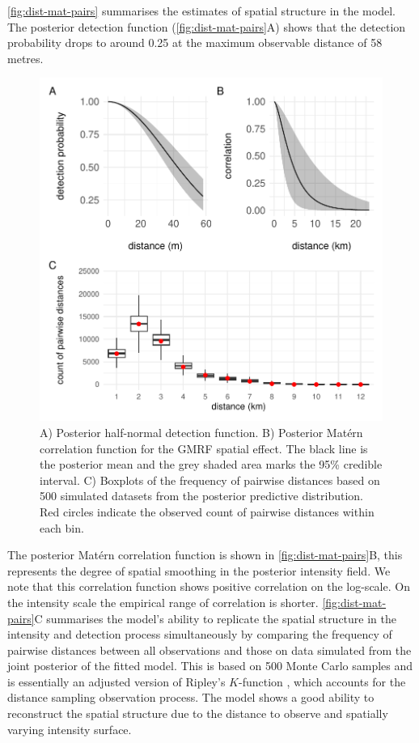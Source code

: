 \documentclass{statsoc}
\begin{document}
\autoref{fig:dist-mat-pairs} summarises the estimates of spatial structure in the model.  The posterior detection function (\autoref{fig:dist-mat-pairs}A) shows that the detection probability drops to around 0.25 at the maximum observable distance of 58 metres.
\begin{figure}[!htb]
	\begin{center}
		\includegraphics[width=\textwidth]{figures/dist_mat_pairs.pdf}
		\caption{A) Posterior half-normal detection function. B) Posterior Mat\'ern correlation function for the GMRF spatial effect.  The black line is the posterior mean and the grey shaded area marks the 95\% credible interval. C) Boxplots of the frequency of pairwise distances based on 500 simulated datasets from the posterior predictive distribution. Red circles indicate the observed count of pairwise distances within each bin.}
		\label{fig:dist-mat-pairs}
	\end{center}
\end{figure}
The posterior Mat\'ern correlation function is shown in \autoref{fig:dist-mat-pairs}B, this represents the degree of spatial smoothing in the posterior intensity field. We note that this correlation function shows positive correlation on the log-scale. On the intensity scale the empirical range of correlation is shorter.  \autoref{fig:dist-mat-pairs}C summarises the model's ability to replicate the spatial structure in the intensity and detection process simultaneously by comparing the frequency of pairwise distances between all observations and those on data simulated from the joint posterior of the fitted model.  This is based on 500 Monte Carlo samples and is essentially an adjusted version of Ripley's $K$-function \citep{ripley_SecondorderAnalysisStationary_1976}, which accounts for the distance sampling observation process.  The model shows a good ability to reconstruct the spatial structure due to the distance to observe and spatially varying intensity surface.
\end{document}
